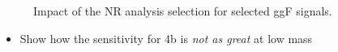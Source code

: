 \begin{figure}[h]
    \centering
    \caption{Impact of the NR analysis selection for selected ggF signals.}
    \label{fig:truth-hh-sel}
\end{figure}


\begin{itemize}
	\item{Show how the sensitivity for 4b is \emph{not as great} at low mass}
\end{itemize}
